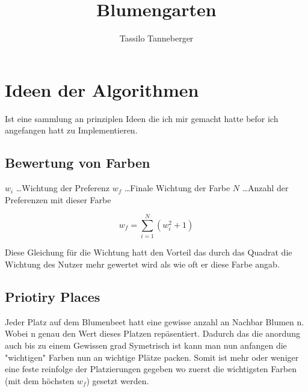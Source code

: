 \documentclass{article}
\begin{document}
\title{Blumengarten}
\author{Tassilo Tanneberger}

\maketitle

\section{Ideen der Algorithmen}
Ist eine sammlung an prinziplen Ideen die ich mir gemacht hatte befor ich angefangen hatt zu Implementieren.
\subsection{Bewertung von Farben}
 
\(w_i\) \dots  	Wichtung der Preferenz \newline
\(w_f\) \dots 	Finale Wichtung der Farbe \newline
\(N\) \dots    	Anzahl der Preferenzen mit dieser Farbe

\begin{equation}
w_f =  \sum \limits_{i=1}^N  (w_i^2 + 1)
\end{equation}

Diese Gleichung für die Wichtung hatt den Vorteil das durch das Quadrat die Wichtung des Nutzer mehr gewertet wird als wie oft er diese Farbe angab.

\subsection{Priotiry Places}

Jeder Platz auf dem Blumenbeet hatt eine gewisse anzahl an Nachbar Blumen n. Wobei n genau den Wert dieses Platzen repäsentiert. Dadurch das die anordung auch bis zu einem Gewissen grad Symetrisch ist kann  man nun anfangen die "wichtigen" Farben nun an wichtige Plätze packen. Somit ist mehr oder weniger eine feste reinfolge der Platzierungen gegeben wo zuerst die wichtigsten Farben (mit dem höchsten \(w_f\)) gesetzt werden.
\end{document}
